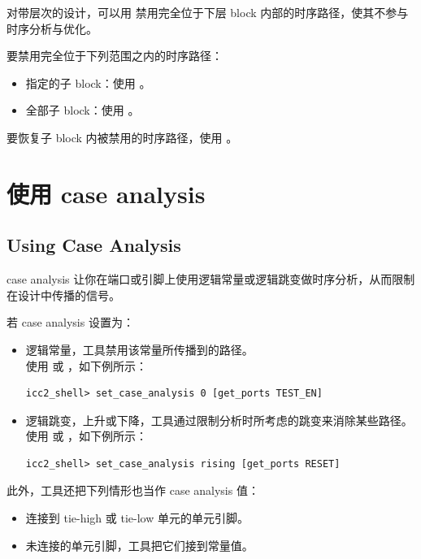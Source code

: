 对带层次的设计，可以用  禁用完全位于下层 block 内部的时序路径，使其不参与时序分析与优化。

要禁用完全位于下列范围之内的时序路径：
\begin{itemize}
  \item 指定的子 block：使用 。
  \item 全部子 block：使用 。
\end{itemize}

要恢复子 block 内被禁用的时序路径，使用 。

\section{使用 case analysis}
\subsection*{Using Case Analysis}

case analysis 让你在端口或引脚上使用逻辑常量或逻辑跳变做时序分析，从而限制在设计中传播的信号。

若 case analysis 设置为：
\begin{itemize}
  \item 逻辑常量，工具禁用该常量所传播到的路径。\\
        使用  或 ，如下例所示：
\begin{lstlisting}
icc2_shell> set_case_analysis 0 [get_ports TEST_EN]
\end{lstlisting}
  \item 逻辑跳变，上升或下降，工具通过限制分析时所考虑的跳变来消除某些路径。\\
        使用  或 ，如下例所示：
\begin{lstlisting}
icc2_shell> set_case_analysis rising [get_ports RESET]
\end{lstlisting}
\end{itemize}

此外，工具还把下列情形也当作 case analysis 值：
\begin{itemize}
  \item 连接到 tie-high 或 tie-low 单元的单元引脚。
  \item 未连接的单元引脚，工具把它们接到常量值。
\end{itemize}

